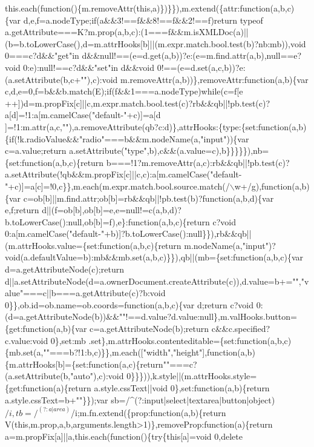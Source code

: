 \begin{DoxyCode}
{       this.each(function()\{m.removeAttr(this,a)\})\}\}),m.extend(\{attr:function(a,b,c)\{var
       d,e,f=a.nodeType;if(a&&3!==f&&8!==f&&2!==f)return typeof
       a.getAttribute===K?m.prop(a,b,c):(1===f&&m.isXMLDoc(a)||(b=b.toLowerCase(),d=m.attrHooks[b]||(m.expr.match.bool.test(b)?nb:mb)),void 0===c?d&&"get"in
       d&&null!==(e=d.get(a,b))?e:(e=m.find.attr(a,b),null==e?void 0:e):null!==c?d&&"set"in d&&void
       0!==(e=d.set(a,c,b))?e:(a.setAttribute(b,c+""),c):void m.removeAttr(a,b))\},removeAttr:function(a,b)\{var
       c,d,e=0,f=b&&b.match(E);if(f&&1===a.nodeType)while(c=f[e
      ++])d=m.propFix[c]||c,m.expr.match.bool.test(c)?rb&&qb||!pb.test(c)?a[d]=!1:a[m.camelCase("default-"+c)]=a[d
      ]=!1:m.attr(a,c,""),a.removeAttribute(qb?c:d)\},attrHooks:\{type:\{set:function(a,b)\{if(!k.radioValue&&"radio"===b&&m.nodeName(a,"input"))\{var c=a.value;return
       a.setAttribute("type",b),c&&(a.value=c),b\}\}\}\}\}),nb=\{set:function(a,b,c)\{return
       b===!1?m.removeAttr(a,c):rb&&qb||!pb.test(c)?a.setAttribute(!qb&&m.propFix[c]||c,c):a[m.camelCase("default-"+c)]=a[c]=!0,c\}\},m.each(m.expr.match.bool.source.match(/\(\backslash\)w+/g),function(a,b)\{var
       c=ob[b]||m.find.attr;ob[b]=rb&&qb||!pb.test(b)?function(a,b,d)\{var e,f;return
       d||(f=ob[b],ob[b]=e,e=null!=c(a,b,d)?b.toLowerCase():null,ob[b]=f),e\}:function(a,b,c)\{return c?void
       0:a[m.camelCase("default-"+b)]?b.toLowerCase():null\}\}),rb&&qb||(m.attrHooks.value=\{set:function(a,b,c)\{return
       m.nodeName(a,"input")?void(a.defaultValue=b):mb&&mb.set(a,b,c)\}\}),qb||(mb=\{set:function(a,b,c)\{var d=a.getAttributeNode(c);return
       d||a.setAttributeNode(d=a.ownerDocument.createAttribute(c)),d.value=b+="","value"===c||b===a.getAttribute(c)?b:void
       0\}\},ob.id=ob.name=ob.coords=function(a,b,c)\{var d;return c?void
       0:(d=a.getAttributeNode(b))&&""!==d.value?d.value:null\},m.valHooks.button=\{get:function(a,b)\{var c=a.getAttributeNode(b);return c&&c.specified?c.value:void
       0\},set:mb
      .set\},m.attrHooks.contenteditable=\{set:function(a,b,c)\{mb.set(a,""===b?!1:b,c)\}\},m.each(["width","height"],function(a,b)\{m.attrHooks[b]=\{set:function(a,c)\{return""===c?(a.setAttribute(b,"auto"),c):void
       0\}\}\})),k.style||(m.attrHooks.style=\{get:function(a)\{return a.style.cssText||void 0\},set:function(a,b)\{return
       a.style.cssText=b+""\}\});var
       sb=/^(?:input|select|textarea|button|object)$/i,tb=/^(?:a|area)$/i;m.fn.extend(\{prop:function(a,b)\{return V(this,m.prop,a,b,arguments.length>1)\},removeProp:function(a)\{return
       a=m.propFix[a]||a,this.each(function()\{try\{this[a]=void 0,delete
}
\end{DoxyCode}

